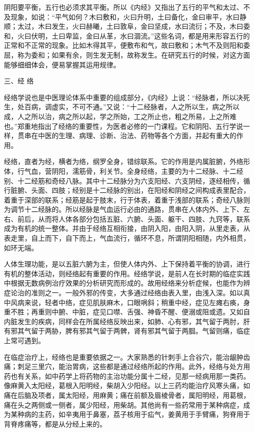 \documentclass[a4paper,12pt,UTF8,twoside]{ctexbook}
\begin{document}
阴阳要平衡，五行也必须求其平衡。所以《内经》又指出了五行的平气和太过、不及现象，如说：“平气如何？木曰敷和，火曰升明，土曰备化，金曰审平，水曰静顺；太过，木曰发生，火曰赫曦，土曰敦阜，金曰坚成，水曰流衍；不及，木曰委和，火曰伏明，土曰卑监，金曰从革，水曰涸流。”这些名词，都是用来形容五行的正常和不正常的现象。比如木得其平，便敷布和气，故曰敷和；木气不及则阳和委屈，称为委和；如果有余，则生发无制，故称发生。在研究五行的时候，对这方面能够细细体会，便易掌握其运用规律。

三、经 络

经络学说也是中医理论体系中重要的组成部分，《内经》上说：“经脉者，所以决死生，处百病，调虚实，不可不通。”又说：“十二经脉者，人之所以生，病之所以成，人之所以治，病之所以起，学之所始，工之所止也，粗之所易，上之所难也。”郑重地指出了经络的重要性，为医者必修的一门课程。它和阴阳、五行学说一样，贯串在中医的生理、病理、诊断、治法、药物等各个方面，并起有重大的作用。

经络，直者为经，横者为络，纲罗全身，错综联系。它的作用是内属脏腑，外络形体，行气血，营阴阳，濡筋骨，利关节。全身经络，主要的为十二经脉、十二经别、十二经筋和奇经八脉。其中十二经脉分为六支阳经、六支阴经，逐经相传，循行脏腑、头面、四肢；经别是十二经脉的别出，在阳经和阴经之间构成表里配合，着重于深部的联系；经筋是起于肢末，行于体表，着重于浅部的联系；奇经八脉则为调节十二经脉的。所以经脉是气血运行必由的通路，贯串在人体内外、上下、左右、前后，从而将人体各部分包括五脏、六腑、头面、躯干、四肢、九窍等，联系成为有机的统一整体。并由于经络互相衔接，由阴入阳，由阳入阴，从里走表，从表走里，自上而下，自下而上，气血流行，循环不息，所谓阴阳相随，内外相贯，如环无端。

人体生理功能，是以五脏六腑为主，但使人体内外、上下保持着平衡的协调，进行有机的整体活动，则经络起有重要的作用。经络学说，是前人在长时期的临症实践中根据无数病例治疗效果的分析研究而形成的。故用经络来分析症候，也能作为辨症论治的准则之一。一般外邪的传变，大多通过经络由表入里，由浅入深。如以真中风病来说，轻者中络，症见肌肤麻木，口眼㖞斜；稍重中经，症见左瘫右痪，身重不胜；再重则中腑、中脏，症见口噤、舌强、神昏不醒、便溺或阻或遗。又如自内脏发生的疾病，同样会在所属经络反映出来，如肺、心有邪，其气留于两肘，肝有邪其气留于两胁，脾有邪其气留于两髀，肾有邪其气留于两腘。气留则痛，临症上常可遇到。

在临症治疗上，经络也是重要依据之一。大家熟悉的针刺手上合谷穴，能治龈肿齿痛；刺足三里穴，能治胃病，这些都是通过经络所起的作用。此外，经络与处方用药也有关系，如中药学上将药物的主治功能分属十二经，见那一经病用那一类药。像麻黄入太阳经，葛根入阳明经，柴胡入少阳经。以上三药均能治疗风寒头痛，如痛在后脑及项者，属太阳经，用麻黄；痛在前额及眉棱骨者，属阳明经，用葛根，痛在头之两侧或一侧者，属少阳经，用柴胡。其他尚有一些药常用于某种病症，成为某种病的主药，如辛夷用于鼻塞，荔子核用于疝气，姜黄用于手臂痛，狗脊用于背脊疼痛等，都是从分经上来的。
\end{document}
